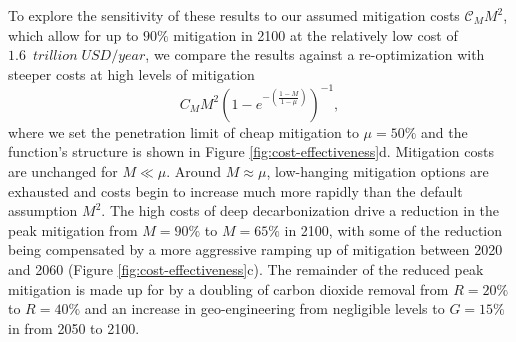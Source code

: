 \documentclass[9pt,twocolumn,twoside,lineno]{pnas-new}
\begin{document}
To explore the sensitivity of these results to our assumed mitigation costs $\mathcal{C}_{M} M^{2}$, which allow for up to $90\%$ mitigation in 2100 at the relatively low cost of $\SI{1.6}{\;trillion\; USD/year}$, we compare the results against a re-optimization with steeper costs at high levels of mitigation
\begin{equation}
    C_{M}M^{2} \left( 1 - e^{-\left(\frac{1-M}{1-\mu}\right)} \right)^{-1},
    \label{eq:high-mitigation-costs}
\end{equation}
where we set the penetration limit of cheap mitigation to $\mu = 50\%$ and the function's structure is shown in Figure \ref{fig:cost-effectiveness}d. Mitigation costs are unchanged for $M \ll \mu$. Around $M \approx \mu$, low-hanging mitigation options are exhausted and costs begin to increase much more rapidly than the default assumption $M^{2}$. The high costs of deep decarbonization drive a reduction in the peak mitigation from $M=90\%$ to $M=65\%$ in 2100, with some of the reduction being compensated by a more aggressive ramping up of mitigation between 2020 and 2060 (Figure \ref{fig:cost-effectiveness}c). The remainder of the reduced peak mitigation is made up for by a doubling of carbon dioxide removal from $R=20\%$ to $R=40\%$ and an increase in geo-engineering from negligible levels to $G=15\%$ in from 2050 to 2100.
\end{document}
